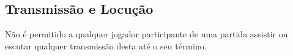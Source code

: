 \subsection{Transmissão e Locução}

Não é permitido a qualquer jogador participante de uma partida assistir ou escutar qualquer transmissão desta até o seu término.
